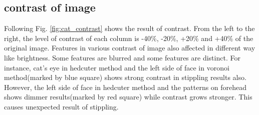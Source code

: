 \documentclass[11pt]{article}
\begin{document}
\subsection{contrast of image}
Following Fig. \ref{fig:cat_contrast} shows the result of contrast. From the left to the right, the level of contrast of each column is -40\%, -20\%, +20\% and +40\% of the original image. Features in various contrast of image also affected in different way like brightness. Some features are blurred and some features are distinct. For instance, cat's eye in hedcuter method and the left side of face in voronoi method(marked by blue square) shows strong contrast in stippling results also. However, the left side of face in hedcuter method and the patterns on forehead shows dimmer results(marked by red square) while contrast grows stronger. This causes unexpected result of stippling.
\end{document}
